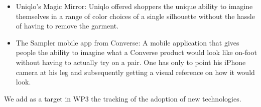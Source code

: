 \begin{itemize}
    \item Uniqlo’s Magic Mirror: Uniqlo offered shoppers the unique ability to imagine themselves in a range of color choices of a single silhouette without the hassle of having to remove the garment.
    \item The Sampler mobile app from Converse: A mobile application that gives people the ability to imagine what a Converse product would look like on-foot without having to actually try on a pair. One has only to point his iPhone camera at his leg and subsequently getting a visual reference on how it would look.
\end{itemize}

We add as a target in WP3 the tracking of the adoption of new technologies.